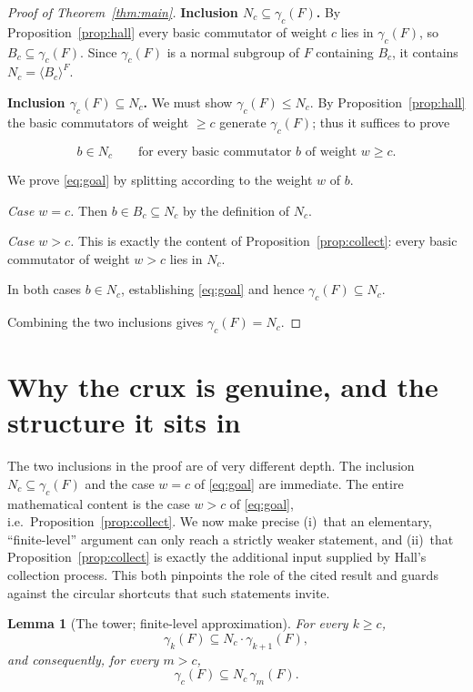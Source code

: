 \documentclass{amsart}
\newtheorem{lemma}{Lemma}
\theoremstyle{definition}
\theoremstyle{remark}
\begin{document}
\begin{proof}[Proof of Theorem~\ref{thm:main}]
\textbf{Inclusion $N_c\subseteq\gamma_c(F)$.}
By Proposition~\ref{prop:hall} every basic commutator of weight $c$ lies in
$\gamma_c(F)$, so $B_c\subseteq\gamma_c(F)$. Since $\gamma_c(F)$ is a normal
subgroup of $F$ containing $B_c$, it contains $N_c=\langle B_c\rangle^{F}$.

\medskip
\textbf{Inclusion $\gamma_c(F)\subseteq N_c$.}
We must show $\gamma_c(F)\le N_c$. By Proposition~\ref{prop:hall} the basic
commutators of weight $\ge c$ generate $\gamma_c(F)$; thus it suffices to prove

\begin{equation}\label{eq:goal}
b\in N_c\qquad\text{for every basic commutator $b$ of weight } w\ge c .
\end{equation}

We prove \eqref{eq:goal} by splitting according to the weight $w$ of $b$.

\emph{Case $w=c$.} Then $b\in B_c\subseteq N_c$ by the definition of $N_c$.

\emph{Case $w>c$.} This is exactly the content of
Proposition~\ref{prop:collect}: every basic commutator of weight $w>c$ lies in
$N_c$.

In both cases $b\in N_c$, establishing \eqref{eq:goal} and hence
$\gamma_c(F)\subseteq N_c$.

\medskip
Combining the two inclusions gives $\gamma_c(F)=N_c$.
\end{proof}

\section{Why the crux is genuine, and the structure it sits in}

The two inclusions in the proof are of very different depth. The inclusion
$N_c\subseteq\gamma_c(F)$ and the case $w=c$ of \eqref{eq:goal} are immediate. The
entire mathematical content is the case $w>c$ of \eqref{eq:goal},
i.e.\ Proposition~\ref{prop:collect}. We now make precise (i)~that an elementary,
``finite-level'' argument can only reach a strictly weaker statement, and
(ii)~that Proposition~\ref{prop:collect} is exactly the additional input supplied
by Hall's collection process. This both pinpoints the role of the cited result and
guards against the circular shortcuts that such statements invite.

\begin{lemma}[The tower; finite-level approximation]\label{lem:tower}
For every $k\ge c$,
\begin{equation}\label{eq:step}
\gamma_k(F)\subseteq N_c\cdot\gamma_{k+1}(F),
\end{equation}
and consequently, for every $m>c$,
\begin{equation}\label{eq:tower}
\gamma_c(F)\subseteq N_c\,\gamma_{m}(F).
\end{equation}
\end{lemma}
\end{document}
